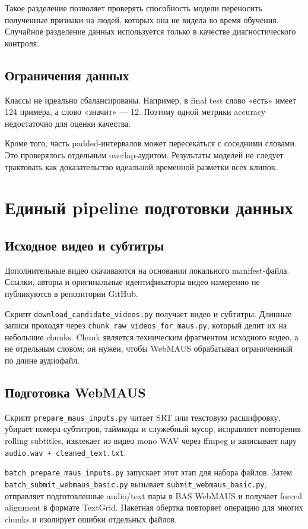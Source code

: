 \documentclass[12pt,a4paper]{article}
\begin{document}
Такое разделение позволяет проверять способность модели переносить
полученные признаки на людей, которых она не видела во время обучения.
Случайное разделение данных используется только в качестве
диагностического контроля.

\subsection{Ограничения данных}

Классы не идеально сбалансированы. Например, в final test слово «есть»
имеет 124 примера, а слово «значит» --- 12. Поэтому одной метрики accuracy
недостаточно для оценки качества.

Кроме того, часть padded-интервалов может пересекаться с соседними словами.
Это проверялось отдельным overlap-аудитом. Результаты моделей не следует
трактовать как доказательство идеальной временной разметки всех клипов.

\section{Единый pipeline подготовки данных}

\subsection{Исходное видео и субтитры}

Дополнительные видео скачиваются на основании локального manifest-файла.
Ссылки, авторы и оригинальные идентификаторы видео намеренно не публикуются
в репозитории GitHub.

Скрипт \texttt{download\_candidate\_videos.py} получает видео и субтитры.
Длинные записи проходят через \texttt{chunk\_raw\_videos\_for\_maus.py},
который делит их на небольшие chunks. Chunk является техническим фрагментом
исходного видео, а не отдельным словом; он нужен, чтобы WebMAUS обрабатывал
ограниченный по длине аудиофайл.

\subsection{Подготовка WebMAUS}

Скрипт \texttt{prepare\_maus\_inputs.py} читает SRT или текстовую
расшифровку, убирает номера субтитров, таймкоды и служебный мусор,
исправляет повторения rolling subtitles, извлекает из видео mono WAV через
ffmpeg и записывает пару \texttt{audio.wav + cleaned\_text.txt}.

\texttt{batch\_prepare\_maus\_inputs.py} запускает этот этап для набора
файлов. Затем \texttt{batch\_submit\_webmaus\_basic.py} вызывает
\texttt{submit\_webmaus\_basic.py}, отправляет подготовленные audio/text
пары в BAS WebMAUS и получает forced alignment в формате TextGrid.
Пакетная обертка повторяет операцию для многих chunks и изолирует ошибки
отдельных файлов.
\end{document}
